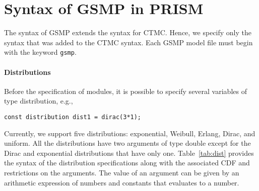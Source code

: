 \documentclass{article}
\renewcommand{\_}{\underline{~}}
\newcommand{\code}[1]{\texttt{#1}}
\begin{document}
\section*{Syntax of GSMP in PRISM}
The syntax of GSMP extends the syntax for CTMC.
Hence, we specify only the syntax that was added to the CTMC syntax. 
Each GSMP model file must begin with the keyword \code{gsmp}. 

\paragraph{Distributions}
Before the specification of modules, it is possible to specify several variables of type distribution, e.g., 
\begin{center}
	\code{const distribution dist1 = dirac(3*1);}
\end{center}
Currently, we support five distributions: exponential, Weibull, Erlang, Dirac, and uniform.
All the distributions have two arguments of type double except for the Dirac and exponential distributions that have only one.
Table~\ref{tab:dist} provides the syntax of the distribution specifications along with the associated CDF and restrictions on the arguments. 
The value of an argument can be given by an arithmetic expression of numbers and constants that evaluates to a number.
\end{document}
